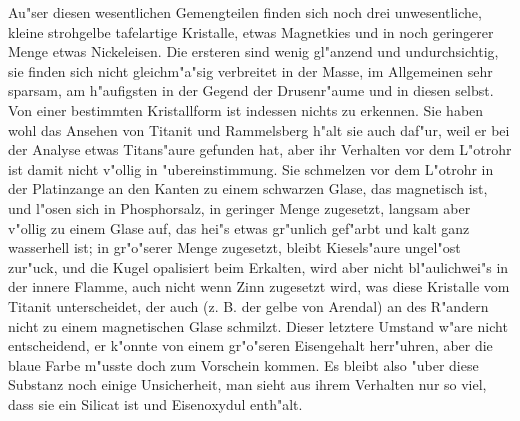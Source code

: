 \documentclass[a4paper, 11pt, oneside]{article}
\begin{document}
Au"ser diesen wesentlichen Gemengteilen finden sich noch drei unwesentliche, kleine strohgelbe tafelartige Kristalle, etwas Magnetkies und in noch geringerer Menge etwas Nickeleisen. Die ersteren sind wenig gl"anzend und undurchsichtig, sie finden sich nicht gleichm"a"sig verbreitet in der Masse, im Allgemeinen sehr sparsam, am h"aufigsten in der Gegend der Drusenr"aume und in diesen selbst. Von einer bestimmten Kristallform ist indessen nichts zu erkennen. Sie haben wohl das Ansehen von Titanit und Rammelsberg h"alt sie auch daf"ur, weil er bei der Analyse etwas Titans"aure gefunden hat, aber ihr Verhalten vor dem L"otrohr ist damit nicht v"ollig in "ubereinstimmung. Sie schmelzen vor dem L"otrohr in der Platinzange an den Kanten zu einem schwarzen Glase, das magnetisch ist, und l"osen sich in Phosphorsalz, in geringer Menge zugesetzt, langsam aber v"ollig zu einem Glase auf, das hei"s etwas gr"unlich gef"arbt und kalt ganz wasserhell ist; in gr"o"serer Menge zugesetzt, bleibt Kiesels"aure ungel"ost zur"uck, und die Kugel opalisiert beim Erkalten, wird aber nicht bl"aulichwei"s in der innere Flamme, auch nicht wenn Zinn zugesetzt wird, was diese Kristalle vom Titanit unterscheidet, der auch (z. B. der gelbe von Arendal) an des R"andern nicht zu einem magnetischen Glase schmilzt. Dieser letztere Umstand w"are nicht entscheidend, er k"onnte von einem gr"o"seren Eisengehalt herr"uhren, aber die blaue Farbe m"usste doch zum Vorschein kommen. Es bleibt also "uber diese Substanz noch einige Unsicherheit, man sieht aus ihrem Verhalten nur so viel, dass sie ein Silicat ist und Eisenoxydul enth"alt.
\end{document}

